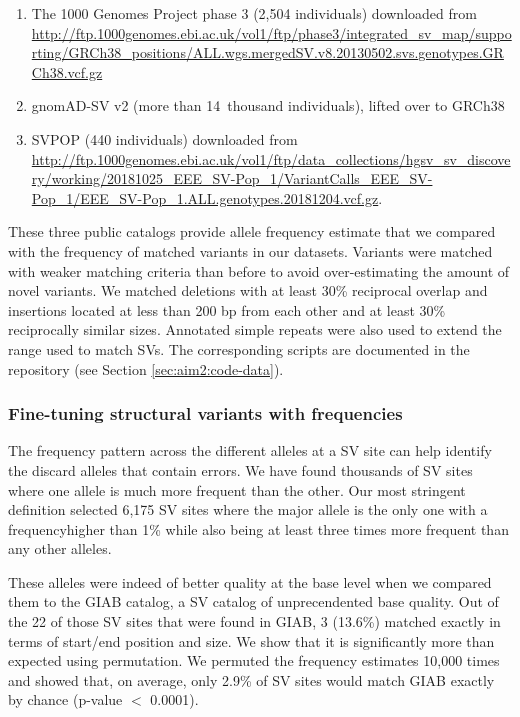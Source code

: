 \documentclass[11pt]{ucscthesis}
\begin{document}
\begin{enumerate}
\item The 1000 Genomes Project phase 3\cite{1000gp_sv_2015} (2,504 individuals) downloaded from \url{http://ftp.1000genomes.ebi.ac.uk/vol1/ftp/phase3/integrated_sv_map/supporting/GRCh38_positions/ALL.wgs.mergedSV.v8.20130502.svs.genotypes.GRCh38.vcf.gz}
\item gnomAD-SV\cite{gnomadsv_2020} v2 (more than 14~thousand individuals), lifted over to GRCh38
\item SVPOP\cite{audano_hgsvc} (440 individuals) downloaded from \url{http://ftp.1000genomes.ebi.ac.uk/vol1/ftp/data_collections/hgsv_sv_discovery/working/20181025_EEE_SV-Pop_1/VariantCalls_EEE_SV-Pop_1/EEE_SV-Pop_1.ALL.genotypes.20181204.vcf.gz}.
\end{enumerate}

These three public catalogs provide allele frequency estimate that we compared with the frequency of matched variants in our datasets.
Variants were matched with weaker matching criteria than before to avoid over-estimating the amount of novel variants.
We matched deletions with at least 30\% reciprocal overlap and insertions located at less than 200 bp from each other and at least 30\% reciprocally similar sizes.
Annotated simple repeats were also used to extend the range used to match SVs.
The corresponding scripts are documented in the repository (see Section \ref{sec:aim2:code-data}).

\subsubsection{Fine-tuning structural variants with frequencies}
\label{subsec:aim2:svfinetuning}

The frequency pattern across the different alleles at a SV site can help identify the discard alleles that contain errors.
We have found thousands of SV sites where one allele is much more frequent than the other.
Our most stringent definition selected 6,175 SV sites where the major allele is the only one with a frequencyhigher than 1\% while also being at least three times more frequent than any other alleles.

These alleles were indeed of better quality at the base level when we compared them to the GIAB catalog\cite{zook_robust_2020}, a SV catalog of unprecendented base quality.
Out of the 22 of those SV sites that were found in GIAB, 3 (13.6\%) matched exactly in terms of start/end position and size.
We show that it is significantly more than expected using permutation.
We permuted the frequency estimates 10,000 times and showed that, on average, only 2.9\% of SV sites would match GIAB exactly by chance (p-value $<$ 0.0001).
\end{document}

